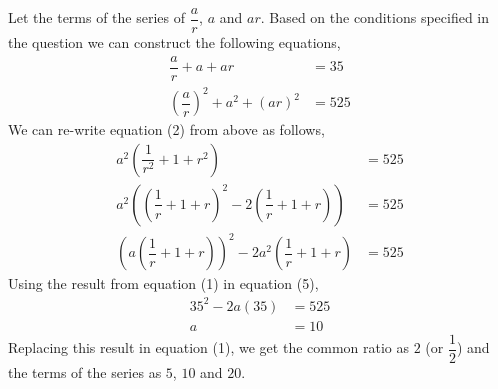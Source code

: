\begin{solution}[\halfpage]
  Let the terms of the series of $\dfrac{a}{r}$, $a$ and $ar$. Based on the conditions specified in the question we can construct the following equations,
  \begin{align}
    \dfrac{a}{r} + a + ar           &= 35 \\
    (\dfrac{a}{r})^2 + a^2 + (ar)^2 &= 525
  \end{align}
  We can re-write equation (2) from above as follows,
  \begin{align}
    a^2(\dfrac{1}{r^2} + 1 + r^2)                            &= 525 \\
    a^2((\dfrac{1}{r} + 1 + r)^2 - 2(\dfrac{1}{r} + 1 + r))  &= 525 \\
    (a(\dfrac{1}{r} + 1 + r))^2 - 2a^2(\dfrac{1}{r} + 1 + r) &= 525
  \end{align}  
  Using the result from equation (1) in equation (5),
  \begin{align}
    35^2 - 2a(35) &= 525 \\
    a             &= 10
  \end{align}
  Replacing this result in equation (1), we get the common ratio as $2$ (or $\dfrac{1}{2}$) and the terms of the series as $5$, $10$ and $20$.
  
\end{solution}

